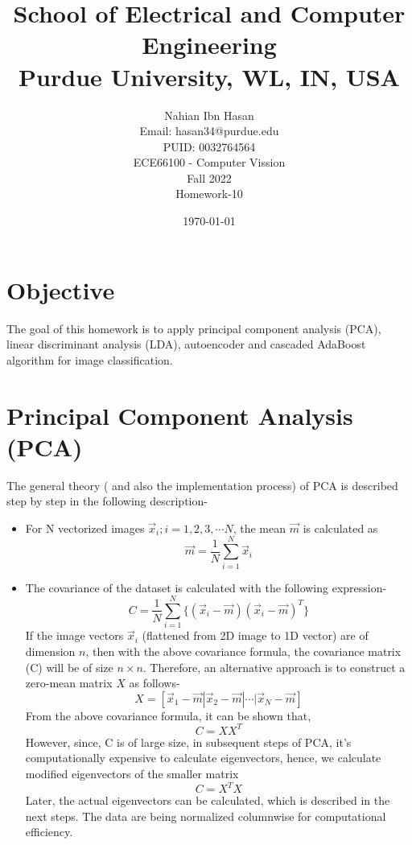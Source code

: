 \documentclass{article}
\title{School of Electrical and Computer Engineering\\
Purdue University, WL, IN, USA}
\author{Nahian Ibn Hasan\\
Email: hasan34@purdue.edu\\
PUID: 0032764564\\
ECE66100 - Computer Vission\\
Fall 2022\\
Homework-10}
\date{\today}
\begin{document}
\maketitle
\section{Objective}
The goal of this homework is to apply principal component analysis (PCA), linear discriminant analysis (LDA), autoencoder and cascaded AdaBoost algorithm for image classification.
\section{Principal Component Analysis (PCA)}
The general theory ( and also the implementation process) of PCA is described step by step in the following description-
\begin{itemize}
\item For N vectorized images {$\vec{x}_i;i=1,2,3,\cdots N$}, the mean $\vec{m}$ is calculated as
\begin{equation}
\vec{m} = \frac{1}{N}\sum_{i=1}^{N}\vec{x}_i
\end{equation}
\item The covariance of the dataset is calculated with the following expression-
\begin{equation}
C = \frac{1}{N}\sum_{i=1}^N\{(\vec{x}_i-\vec{m})(\vec{x}_i-\vec{m})^T\}
\end{equation}
If the image vectors $\vec{x}_i$ (flattened from 2D image to 1D vector) are of dimension $n$, then with the above covariance formula, the covariance matrix (C) will be of size $n\times n$. Therefore, an alternative approach is to construct a zero-mean matrix $X$ as follows-
\begin{equation}
X = [\vec{x}_1-\vec{m} | \vec{x}_2-\vec{m} | \cdots |\vec{x}_N-\vec{m}]
\end{equation}
From the above covariance formula, it can be shown that,
\begin{equation}
	C = XX^T
\end{equation}
However, since, C is of large size, in subsequent steps of PCA, it's computationally expensive to calculate eigenvectors, hence, we calculate modified eigenvectors  of the smaller matrix 
\begin{equation}
	C = X^TX
\end{equation}
Later, the actual eigenvectors can be calculated, which is described in the next steps. The data are being normalized columnwise for computational efficiency.

\end{itemize}
\end{document}
